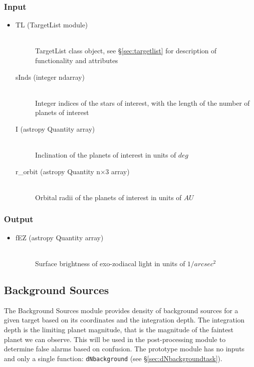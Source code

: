 \documentclass[cleanfoot]{asme2ej}
\begin{document}
\subsubsection*{Input}
\begin{itemize}
\item 
\begin{description}
    \item[TL (TargetList module)] \hfill \\ TargetList class object, see \S\ref{sec:targetlist} for description of functionality and attributes
    \item[sInds (integer ndarray)] \hfill \\ Integer indices of the stars of interest, with the length of the number of planets of interest
    \item[I (astropy Quantity array)] \hfill \\ Inclination of the planets of interest in units of $ deg $
    \item[r\_orbit (astropy Quantity n$\times$3 array)] \hfill \\ Orbital radii of the planets of interest in units of $ AU $
\end{description}
\end{itemize}

\subsubsection*{Output}
\begin{itemize}
\item 
\begin{description}
    \item[fEZ (astropy Quantity array)] \hfill \\ Surface brightness of exo-zodiacal light in units of $ 1/arcsec^2 $
\end{description}
\end{itemize}



\subsection{Background Sources}\label{sec:backgroundsources}

The Background Sources module provides density of background sources for a given target based on its coordinates and the integration depth. The integration depth is the limiting planet magnitude, that is the magnitude of the faintest planet we can observe. This will be used in the post-processing module to determine false alarms based on confusion.  The prototype module has no inputs and only a single function: \verb+dNbackground+ (see \S\ref{sec:dNbackgroundtask}).
\end{document}
